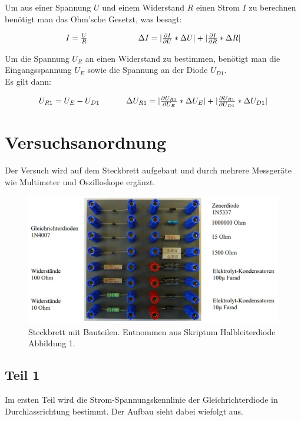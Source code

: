 \documentclass[12pt,a4paper,twoside]{article}
\begin{document}
\noindent
Um aus einer Spannung $U$ und einem Widerstand $R$ einen Strom $I$ zu berechnen benötigt man das Ohm'sche Gesetzt, was besagt: 

\begin{equation}
    \label{eq:ohmsche}
    \centerline{$I=\frac{U}{R}$ \\ $\Delta I = \vert \frac{\partial I}{\partial U} * \Delta U \vert + \vert \frac{\partial I}{\partial R} * \Delta R \vert $}
\end{equation}

\noindent
Um die Spannung $U_R$ an einen Widerstand zu bestimmen, benötigt man die Eingangsspannung $U_E$ sowie die Spannung an der Diode $U_{D1}$. 
\\
Es gilt dann: 

\begin{equation}
    \label{eq:ur1}
    \centerline{$U_{R1}= U_E - U_{D1}$ \\ $\Delta U_{R1} = \vert \frac{\partial U_{R1}}{\partial U_E} * \Delta U_E \vert + \vert \frac{\partial U_{R1}}{\partial U_{D1}} * \Delta U_{D1} \vert $}
\end{equation}

\section{Versuchsanordnung} %
Der Versuch wird auf dem Steckbrett aufgebaut und durch mehrere Messgeräte wie Multimeter und Oszilloskope ergänzt. 

\begin{figure}[H]
    \centering
    \includegraphics[width=0.6\linewidth]{nudes/steckbrett.jpg}
    \caption{Steckbrett mit Bauteilen. Entnommen aus Skriptum Halbleiterdiode Abbildung 1. \cite{teachcenter2}}
    \label{fig:Steckbrett}
\end{figure}

\subsection{Teil 1}
Im ersten Teil wird die Strom-Spannungskennlinie der Gleichrichterdiode in Durchlassrichtung bestimmt. Der Aufbau sieht dabei wiefolgt aus. 
\end{document}
